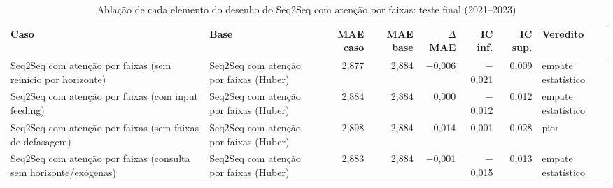 \begin{table}[!htbp]
    \centering
    \caption{Ablação de cada elemento do desenho do Seq2Seq com atenção por faixas: teste final (2021--2023)}
    \label{tab:ablacao_desenho_holdout}
    \small
    \begin{adjustbox}{max width=\textwidth}
    \begin{tabular}{>{\raggedright\arraybackslash}p{}lrrrrrl}
        \toprule
        Caso & Base & MAE caso & MAE base & $\Delta$ MAE & IC inf. & IC sup. & Veredito \\
        \midrule
        Seq2Seq com atenção por faixas (sem reinício por horizonte) & Seq2Seq com atenção por faixas (Huber) & 2,877 & 2,884 & $-$0,006 & $-$0,021 & 0,009 & empate estatístico \\
        Seq2Seq com atenção por faixas (com input feeding) & Seq2Seq com atenção por faixas (Huber) & 2,884 & 2,884 & 0,000 & $-$0,012 & 0,012 & empate estatístico \\
        Seq2Seq com atenção por faixas (sem faixas de defasagem) & Seq2Seq com atenção por faixas (Huber) & 2,898 & 2,884 & 0,014 & 0,001 & 0,028 & pior \\
        Seq2Seq com atenção por faixas (consulta sem horizonte/exógenas) & Seq2Seq com atenção por faixas (Huber) & 2,883 & 2,884 & $-$0,001 & $-$0,015 & 0,013 & empate estatístico \\
        \bottomrule
    \end{tabular}
    \end{adjustbox}
\end{table}
